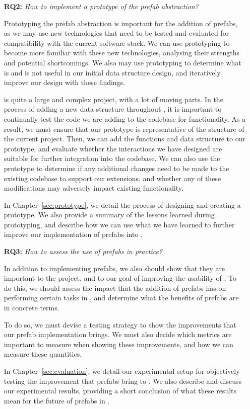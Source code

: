\documentclass[11pt]{article}
\begin{document}
\begin{itemize}
			\item [\textbf{RQ2:}]\label{itm:two} \textit{How to implement a prototype of the prefab abstraction?}
			
			Prototyping the prefab abstraction is important for the addition of prefabs, as we may use new technologies that need to be tested and evaluated for compatibility with the current \opendc{} software stack.
			We can use prototyping to become more familiar with these new technologies, analysing their strengths and potential shortcomings.
			We also may use prototyping to determine what is and is not useful in our initial data structure design, and iteratively improve our design with these findings.

			\opendc{} is quite a large and complex project, with a lot of moving parts.
			In the process of adding a new data structure throughout \opendc{}, it is important to continually test the code we are adding to the codebase for functionality.
			As a result, we must ensure that our prototype is representative of the structure of the current \opendc{} project.
			Then, we can add the functions and data structure to our prototype, and evaluate whether the interactions we have designed are suitable for further integration into the \opendc{} codebase.
			We can also use the prototype to determine if any additional changes need to be made to the existing codebase to support our extensions, and whether any of these modifications may adversely impact existing functionality.

			In Chapter~\ref{sec:prototype}, we detail the process of designing and creating a prototype.
			We also provide a summary of the lessons learned during prototyping, and describe how we can use what we have learned to further improve our implementation of prefabs into \opendc{}.
			\item [\textbf{RQ3:}]\label{itm:three} \textit{How to assess the use of prefabs in practice?}

			In addition to implementing prefabs, we also should show that they are important to the \opendc{} project, and to our goal of improving the usability of \opendc{}.
			To do this, we should assess the impact that the addition of prefabs has on performing certain tasks in \opendc{}, and determine what the benefits of prefabs are in concrete terms.

			To do so, we must devise a testing strategy to show the improvements that our prefab implementation brings.
			We must also decide which metrics are important to measure when showing these improvements, and how we can measure these quantities.

			In Chapter~\ref{sec:evaluation}, we detail our experimental setup for objectively testing the improvement that prefabs bring to \opendc{}.
			We also describe and discuss our experimental results, providing a short conclusion of what these results mean for the future of prefabs in \opendc{}.
			
		\end{itemize}
	
\end{document}
